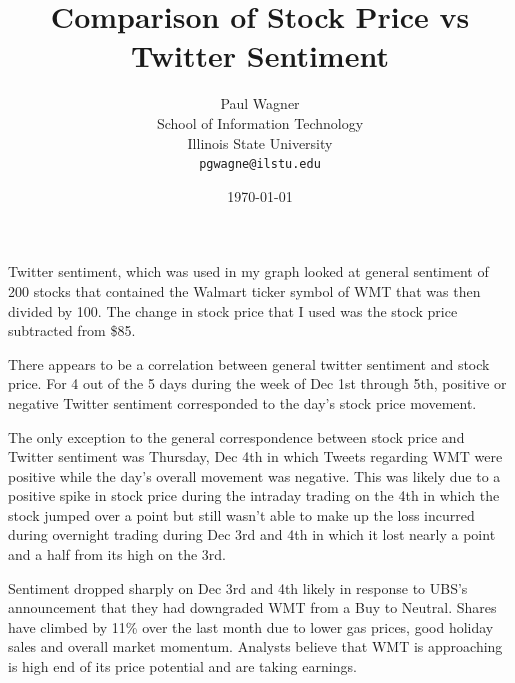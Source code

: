 \documentclass{article}\usepackage[]{graphicx}\usepackage[]{color}
\begin{document}
\title {Comparison of Stock Price vs Twitter Sentiment} 
\author { Paul Wagner  
\\ School of Information Technology 
\\ Illinois State University
\\
\texttt{pgwagne@ilstu.edu}}
\date{\today} 
\maketitle

Twitter sentiment, which was used in my graph looked at general sentiment of 200 stocks that contained the Walmart ticker symbol of WMT that was then divided by 100. The change in stock price that I used was the stock price subtracted from \$85.

There appears to be a correlation between general twitter sentiment and stock price. For 4 out of the 5 days during the week of Dec 1st through 5th, positive or negative Twitter sentiment corresponded to the day’s stock price movement. 

The only exception to the general correspondence between stock price and Twitter sentiment was Thursday, Dec 4th in which Tweets regarding WMT were positive while the day’s overall movement was negative. This was likely due to a positive spike in stock price during the intraday trading on the 4th in which the stock jumped over a point but still wasn’t able to make up the loss incurred during overnight trading during Dec 3rd and 4th in which it lost nearly a point and a half from its high on the 3rd.

Sentiment dropped sharply on Dec 3rd and 4th likely in response to UBS’s announcement that they had downgraded WMT from a Buy to Neutral. Shares have climbed by 11\% over the last month due to lower gas prices, good holiday sales and overall market momentum. Analysts believe that WMT is approaching is high end of its price potential and are taking earnings.
\end{document}
